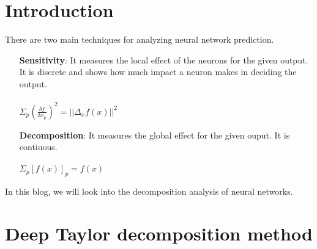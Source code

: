 \documentclass{article}
\begin{document}
	\section{Introduction}
	There are two main techniques for analyzing neural network prediction.
	\begin{itemize}
		
		\item[\textbf{Sensitivity}:] It  measures the local effect of the neurons for the given output. It is discrete and shows how much impact a neuron makes in deciding the output. \\
		\medspace \\
		$\Sigma_{p} (\frac{\delta f}{\delta x_{p}})^2 = \lvert \lvert \Delta_{x} f(x) \rvert \rvert^2$
		\item[\textbf{Decomposition}:] It measures the global effect for the given ouput. It is contiuous.  \\ 
		\medspace \\
		$\Sigma_{p} [f(x)]_{p} = f(x)$
	\end{itemize}
	In this blog, we will look into the decomposition analysis of neural networks. 
	\section{Deep Taylor decomposition method}
	
\end{document}
